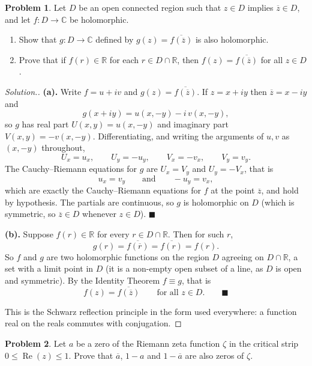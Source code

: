 \documentclass[11pt,a4paper]{article}
\theoremstyle{definition}
\newtheorem{problemx}{Problem}[section]
\newenvironment{problem}{\begin{problemx}}{\end{problemx}}
\newenvironment{solution}
  {\renewcommand{\qedsymbol}{}\begin{proof}[\textit{Solution}.]}
  {\end{proof}}
\begin{document}
\begin{problem}
Let $D$ be an open connected region such that $z \in D$ implies
$\overline{z} \in D$, and let $f : D \rightarrow \mathbb{C}$ be holomorphic.
\begin{enumerate}
\item[(a).] Show that $g : D \rightarrow \mathbb{C}$ defined by
$g(z) = \overline{f\!\left(\overline{z}\right)}$ is also holomorphic.
\item[(b).] Prove that if $f(r) \in \mathbb{R}$ for each
$r \in D \cap \mathbb{R}$, then
$f(z) = \overline{f\!\left(\overline{z}\right)}$ for all $z \in D$.
\end{enumerate}
\end{problem}

\begin{solution}
\textbf{(a).} Write $f = u+iv$ and $g(z) = \overline{f(\overline{z})}$. If
$z = x+iy$ then $\overline{z} = x - iy$ and
$$g(x+iy) = u(x,-y) - i\,v(x,-y),$$
so $g$ has real part $U(x,y) = u(x,-y)$ and imaginary part $V(x,y) = -v(x,-y)$.
Differentiating, and writing the arguments of $u,v$ as $(x,-y)$ throughout,
$$U_x = u_x,\qquad U_y = -u_y,\qquad V_x = -v_x,\qquad V_y = v_y .$$
The Cauchy--Riemann equations for $g$ are $U_x = V_y$ and $U_y = -V_x$, that is
$$u_x = v_y \qquad\text{and}\qquad -u_y = v_x ,$$
which are exactly the Cauchy--Riemann equations for $f$ at the point
$\overline{z}$, and hold by hypothesis. The partials are continuous, so $g$ is
holomorphic on $D$ (which is symmetric, so $\overline{z} \in D$ whenever
$z \in D$). $\blacksquare$

\textbf{(b).} Suppose $f(r) \in \mathbb{R}$ for every $r \in D \cap \mathbb{R}$.
Then for such $r$,
$$g(r) = \overline{f(\overline{r})} = \overline{f(r)} = f(r).$$
So $f$ and $g$ are two holomorphic functions on the region $D$ agreeing on
$D \cap \mathbb{R}$, a set with a limit point in $D$ (it is a non-empty open subset
of a line, as $D$ is open and symmetric). By the Identity Theorem $f \equiv g$,
that is
$$f(z) = \overline{f\!\left(\overline{z}\right)} \qquad\text{for all } z \in D .
\qquad \blacksquare$$

This is the Schwarz reflection principle in the form used everywhere: a function
real on the reals commutes with conjugation.
\end{solution}


\begin{problem}
Let $a$ be a zero of the Riemann zeta function $\zeta$ in the critical strip
$0 \leq \operatorname{Re}(z) \leq 1$. Prove that $\overline{a}$, $1 - a$ and
$1 - \overline{a}$ are also zeros of $\zeta$.
\end{problem}
\end{document}
